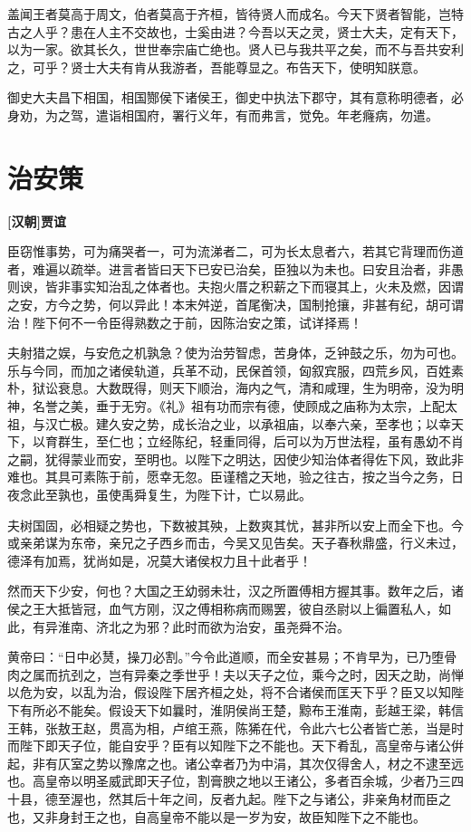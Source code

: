 \documentclass[UTF8,titlepage,oneside]{ctexbook}
\begin{document}
盖闻王者莫高于周文，伯者莫高于齐桓，皆待贤人而成名。今天下贤者智能，岂特古之人乎？患在人主不交故也，士奚由进？今吾以天之灵，贤士大夫，定有天下，以为一家。欲其长久，世世奉宗庙亡绝也。贤人已与我共平之矣，而不与吾共安利之，可乎？贤士大夫有肯从我游者，吾能尊显之。布告天下，使明知朕意。


御史大夫昌下相国，相国酂侯下诸侯王，御史中执法下郡守，其有意称明德者，必身劝，为之驾，遣诣相国府，署行义年，有而弗言，觉免。年老癃病，勿遣。



\chapter*{治安策}
\begin{center}
	\textbf{[汉朝]贾谊}
\end{center}


臣窃惟事势，可为痛哭者一，可为流涕者二，可为长太息者六，若其它背理而伤道者，难遍以疏举。进言者皆曰天下已安已治矣，臣独以为未也。曰安且治者，非愚则谀，皆非事实知治乱之体者也。夫抱火厝之积薪之下而寝其上，火未及燃，因谓之安，方今之势，何以异此！本末舛逆，首尾衡决，国制抢攘，非甚有纪，胡可谓治！陛下何不一令臣得熟数之于前，因陈治安之策，试详择焉！


夫射猎之娱，与安危之机孰急？使为治劳智虑，苦身体，乏钟鼓之乐，勿为可也。乐与今同，而加之诸侯轨道，兵革不动，民保首领，匈叙宾服，四荒乡风，百姓素朴，狱讼衰息。大数既得，则天下顺治，海内之气，清和咸理，生为明帝，没为明神，名誉之美，垂于无穷。《礼》祖有功而宗有德，使顾成之庙称为太宗，上配太祖，与汉亡极。建久安之势，成长治之业，以承祖庙，以奉六亲，至孝也；以幸天下，以育群生，至仁也；立经陈纪，轻重同得，后可以为万世法程，虽有愚幼不肖之嗣，犹得蒙业而安，至明也。以陛下之明达，因使少知治体者得佐下风，致此非难也。其具可素陈于前，愿幸无忽。臣谨稽之天地，验之往古，按之当今之务，日夜念此至孰也，虽使禹舜复生，为陛下计，亡以易此。


夫树国固，必相疑之势也，下数被其殃，上数爽其忧，甚非所以安上而全下也。今或亲弟谋为东帝，亲兄之子西乡而击，今吴又见告矣。天子春秋鼎盛，行义未过，德泽有加焉，犹尚如是，况莫大诸侯权力且十此者乎！


然而天下少安，何也？大国之王幼弱未壮，汉之所置傅相方握其事。数年之后，诸侯之王大抵皆冠，血气方刚，汉之傅相称病而赐罢，彼自丞尉以上徧置私人，如此，有异淮南、济北之为邪？此时而欲为治安，虽尧舜不治。


黄帝曰：“日中必熭，操刀必割。”今令此道顺，而全安甚易；不肯早为，已乃堕骨肉之属而抗刭之，岂有异秦之季世乎！夫以天子之位，乘今之时，因天之助，尚惮以危为安，以乱为治，假设陛下居齐桓之处，将不合诸侯而匡天下乎？臣又以知陛下有所必不能矣。假设天下如曩时，淮阴侯尚王楚，黥布王淮南，彭越王梁，韩信王韩，张敖王赵，贯高为相，卢绾王燕，陈狶在代，令此六七公者皆亡恙，当是时而陛下即天子位，能自安乎？臣有以知陛下之不能也。天下肴乱，高皇帝与诸公倂起，非有仄室之势以豫席之也。诸公幸者乃为中涓，其次仅得舍人，材之不逮至远也。高皇帝以明圣威武即天子位，割膏腴之地以王诸公，多者百余城，少者乃三四十县，德至渥也，然其后十年之间，反者九起。陛下之与诸公，非亲角材而臣之也，又非身封王之也，自高皇帝不能以是一岁为安，故臣知陛下之不能也。
\end{document}
